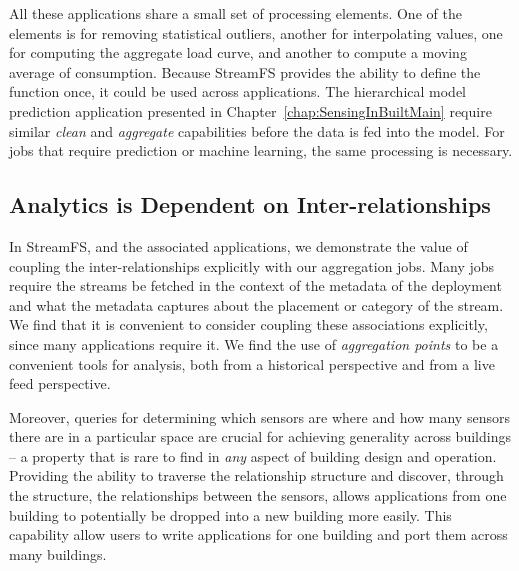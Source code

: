 All these applications share a small set of processing elements.  One of the elements is for removing statistical outliers, 
another for interpolating values, one for computing the aggregate load curve, and another to compute a moving average of consumption.
Because StreamFS provides the ability to define the function once, it could be used across applications.
The hierarchical model prediction application presented in Chapter~\ref{chap:SensingInBuiltMain} require similar
\emph{clean} and \emph{aggregate} capabilities before the data is fed into the model.  For jobs that require  
prediction or machine learning, the same processing is necessary.

\subsection{Analytics is Dependent on Inter-relationships}
In StreamFS, and the associated applications, we demonstrate the value of coupling the inter-relationships explicitly with 
our aggregation jobs.  Many jobs require the streams be fetched in the context of the metadata of the deployment and what 
the metadata captures about the placement or category of the stream.  We find that it is convenient to consider
coupling these associations explicitly, since many applications require it.  We find the use of \emph{aggregation points}
to be a convenient tools for analysis, both from a historical perspective and from a live feed perspective.

Moreover, queries for determining which sensors are where and how many sensors there are in a particular space are crucial
for achieving generality across buildings -- a property that is rare to find in \emph{any} aspect of building design and operation.
Providing the ability to traverse the relationship structure and discover, through the structure, the relationships 
between the sensors, allows applications from one building to potentially be dropped into a new building more easily.  
This capability allow users to write applications for one building and port them across many buildings.


